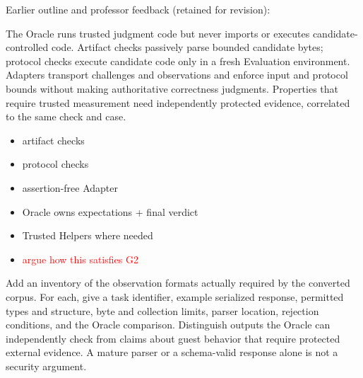 \documentclass[conference]{IEEEtran}
\newcommand{\draft}[1]{%
    \par\noindent
    {\color{gray}\small #1}
    \par
}
\newcommand{\teacher}[1]{\textcolor{red}{#1}}
\newcommand{\secondtalk}[1]{{\color{secondtalkblue}#1}}
\begin{document}
\draft{Earlier outline and professor feedback (retained for revision):}
\secondtalk{The Oracle runs trusted judgment code but never imports or executes candidate-controlled code. Artifact checks passively parse bounded candidate bytes; protocol checks execute candidate code only in a fresh Evaluation environment. Adapters transport challenges and observations and enforce input and protocol bounds without making authoritative correctness judgments. Properties that require trusted measurement need independently protected evidence, correlated to the same check and case.}

\draft{
\begin{itemize}
    \item artifact checks
    \item protocol checks
    \item assertion-free Adapter
    \item Oracle owns expectations + final verdict
    \item Trusted Helpers where needed
    \item \teacher{argue how this satisfies G2}
\end{itemize}
}
\draft{\secondtalk{Add an inventory of the observation formats actually required by the converted corpus. For each, give a task identifier, example serialized response, permitted types and structure, byte and collection limits, parser location, rejection conditions, and the Oracle comparison. Distinguish outputs the Oracle can independently check from claims about guest behavior that require protected external evidence. A mature parser or a schema-valid response alone is not a security argument.}}
\end{document}

